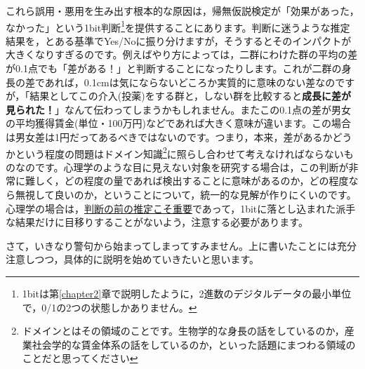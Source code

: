 \documentclass{ltjsbook}
\begin{document}
これら誤用・悪用を生み出す根本的な原因は，帰無仮説検定が「効果があった，なかった」という1bit判断\footnote{1bitは第\ref{chapter2}章で説明したように，2進数のデジタルデータの最小単位で，0/1の2つの状態しかありません。}を提供することにあります。判断に迷うような推定結果を，とある基準でYes/Noに振り分けますが，そうするとそのインパクトが大きくなりすぎるのです。例えばやり方によっては，二群にわけた群の平均の差が0.1点でも「差がある！」と判断することになったりします。これが二群の身長の差であれば，0.1cmは気にならないどころか実質的に意味のない差なのですが，「結果としてこの介入(投薬)をする群と，しない群を比較すると\textbf{成長に差が見られた！}」なんて伝わってしまうかもしれません。またこの0.1点の差が男女の平均獲得賃金(単位・100万円)などであれば大きく意味が違います。この場合は男女差は1円だってあるべきではないのです。つまり，本来，差があるかどうかという程度の問題はドメイン知識\footnote{ドメインとはその領域のことです。生物学的な身長の話をしているのか，産業社会学的な賃金体系の話をしているのか，といった話題にまつわる領域のことだと思ってください}に照らし合わせて考えなければならないものなのです。心理学のような目に見えない対象を研究する場合は，この判断が非常に難しく，どの程度の量であれば検出することに意味があるのか，どの程度なら無視して良いのか，ということについて，統一的な見解が作りにくいのです。心理学の場合は，\underline{判断の前の推定こそ重要}であって，1bitに落とし込まれた派手な結果だけに目移りすることがないよう，注意する必要があります。


さて，いきなり警句から始まってしまってすみません。上に書いたことには充分注意しつつ，具体的に説明を始めていきたいと思います。

\end{document}
